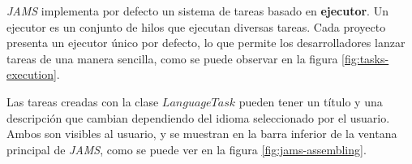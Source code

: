 \textit{JAMS} implementa por defecto un
sistema de tareas basado en \textbf{ejecutor}.
Un ejecutor es un conjunto de hilos que ejecutan
diversas tareas.
Cada proyecto presenta un ejecutor único por defecto,
lo que permite los desarrolladores lanzar tareas de una
manera sencilla, como se puede observar en la figura \ref{fig:tasks-execution}.

Las tareas creadas con la clase $LanguageTask$
pueden tener un título y una descripción que cambian dependiendo
del idioma seleccionado por el usuario.
Ambos son visibles al usuario, y se muestran
en la barra inferior de la ventana principal de \textit{JAMS},
como se puede ver en la figura \ref{fig:jams-assembling}.
